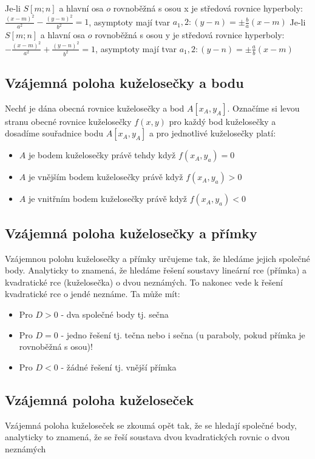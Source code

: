     \vspace{1em}
    Je-li $S[m;n]$ a hlavní osa $o$ rovnoběžná s osou x je středová rovnice hyperboly: $\frac{(x-m)^2}{a^2} - \frac{(y-n)^2}{b^2}=1$, asymptoty mají tvar $a_1,2: (y-n)=\pm \frac{b}{a}(x-m)$
    Je-li $S[m;n]$ a hlavní osa $o$ rovnoběžná s osou y je středová rovnice hyperboly: $-\frac{(x-m)^2}{a^2} + \frac{(y-n)^2}{b^2}=1$, asymptoty mají tvar $a_1,2: (y-n)=\pm \frac{a}{b}(x-m)$
    
\subsection{Vzájemná poloha kuželosečky a bodu}
    Nechť je dána obecná rovnice kuželosečky a bod $A[x_A,y_A]$. Označíme si levou stranu obecné rovnice kuželosečky $f(x,y)$ pro každý bod kuželosečky a dosadíme souřadnice bodu $A[x_A,y_A]$ a pro jednotlivé kuželosečky platí: \begin{itemize}
        \item $A$ je bodem kuželosečky právě tehdy když $f(x_A,y_a)=0$
        \item $A$ je vnějším bodem kuželosečky právě když $f(x_A,y_a)>0$
        \item $A$ je vnitřním bodem kuželosečky právě když $f(x_A,y_a)<0$
    \end{itemize}
\subsection{Vzájemná poloha kuželosečky a přímky}
    Vzájemnou polohu kuželosečky a přímky určujeme tak, že hledáme jejich společné body. Analyticky to znamená, že hledáme řešení soustavy lineární rce (přímka) a kvadratické rce (kuželosečka) o dvou neznámých. To nakonec vede k řešení kvadratické rce o jendé neznáme. Ta může mít: \begin{itemize}
        \item Pro $D>0$ - dva společné body tj. sečna
        \item Pro $D=0$ - jedno řešení tj. tečna nebo i sečna (u paraboly, pokud přímka je rovnoběžná s osou)!
        \item Pro $D<0$ - žádné řešení tj. vnější přímka
    \end{itemize}
\subsection{Vzájemná poloha kuželoseček}
    Vzájemná poloha kuželoseček se zkoumá opět tak, že se hledají společné body, analyticky to znamená, že se řeší soustava dvou kvadratických rovnic o dvou neznámých